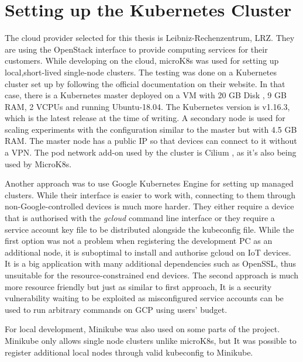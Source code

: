 \section{Setting up the Kubernetes Cluster}
The cloud provider selected for this thesis is Leibniz-Rechenzentrum, LRZ. They are using the OpenStack \cite{openstack} interface to provide computing services for their customers. While developing on the cloud, microK8s was used for setting up local,short-lived single-node clusters. The testing was done on a Kubernetes cluster set up by following the official documentation on their website. In that case, there is a Kubernetes master deployed on a VM with 20 GB Disk , 9 GB RAM, 2 VCPUs and running Ubuntu-18.04. The Kubernetes version is v1.16.3, which is the latest release at the time of writing. A secondary node is used for scaling experiments with the configuration similar to the master but with 4.5 GB RAM. The master node has a public IP so that devices can connect to it without a VPN. The pod network add-on used by the cluster is Cilium \cite{cilium}, as it's also being used by MicroK8s.

Another approach was to use Google Kubernetes Engine for setting up managed clusters. While their interface is easier to work with, connecting to them through non-Google-controlled devices is much more harder. They either require a device that is authorised with the \textit{gcloud} command line interface or they require a service account key file to be distributed alongside the kubeconfig file. While the first option was not a problem when registering the development PC as an additional node, it is suboptimal to install and authorise gcloud on IoT devices. It is a big application with many additional dependencies such as OpenSSL, thus unsuitable for the resource-constrained end devices. The second approach is much more resource friendly but just as similar to first approach, It is a security vulnerability waiting to be exploited as misconfigured service accounts can be used to run arbitrary commands on GCP using users' budget.

For local development, Minikube was also used on some parts of the project. Minikube only allows single node clusters unlike microK8s, but It was possible to register additional local nodes through valid kubeconfig to Minikube.
